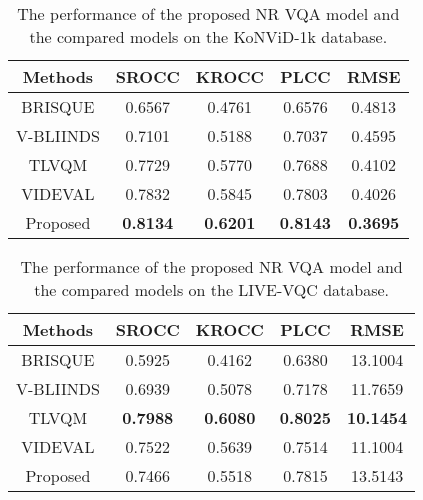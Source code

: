 \documentclass{article}
\begin{document}
\begin{table}
	\small
\centering
	\renewcommand{\arraystretch}{1.15}
	\caption{The performance of the proposed NR VQA model and the compared models on the KoNViD-1k database.}
	\label{NR_KoNViD-1k}
\begin{tabular}{c|cccc}
		\toprule[.15em]
		
		Methods & SROCC & KROCC & PLCC & RMSE   \\
		\hline
		
		BRISQUE \cite{mittal2012no}    &0.6567  &0.4761  & 0.6576  &0.4813  \\
		
		
		V-BLIINDS \cite{saad2014blind}  &0.7101  &0.5188  &0.7037&0.4595 \\
		
		TLVQM \cite{korhonen2019two} &0.7729  &0.5770  &0.7688 &0.4102   \\
		
		VIDEVAL \cite{tu2021ugc} &0.7832  &0.5845  &0.7803 &0.4026   \\
		
		
		Proposed    & \textbf{0.8134} 	&\textbf{ 0.6201} 	&\textbf{0.8143} 	&\textbf{0.3695} \\
		
		\bottomrule[.15em]
		
	\end{tabular}	
\vspace{-0.2cm}	
\end{table}


\begin{table}
	\small
\centering
	\renewcommand{\arraystretch}{1.15}
	\caption{The performance of the proposed NR VQA model and the compared models on the LIVE-VQC database.}
	\label{NR_LIVE-VQC}
\begin{tabular}{c|cccc}
		\toprule[.15em]
		
		Methods & SROCC & KROCC & PLCC & RMSE   \\
		\hline
		
		BRISQUE \cite{mittal2012no}    &0.5925  &0.4162  & 0.6380  &13.1004  \\
		
		
		V-BLIINDS \cite{saad2014blind}  &0.6939  &0.5078  &0.7178&11.7659 \\
		
		TLVQM \cite{korhonen2019two} & \textbf{0.7988}  &\textbf{0.6080}  &\textbf{0.8025} &\textbf{10.1454}   \\
		
		VIDEVAL \cite{tu2021ugc} &0.7522  &0.5639  &0.7514 &11.1004   \\
		
		
		Proposed    &0.7466 	&0.5518	&0.7815	&13.5143 \\
		
		\bottomrule[.15em]
		
	\end{tabular}	
\vspace{-0.2cm}	
\end{table}
\end{document}
